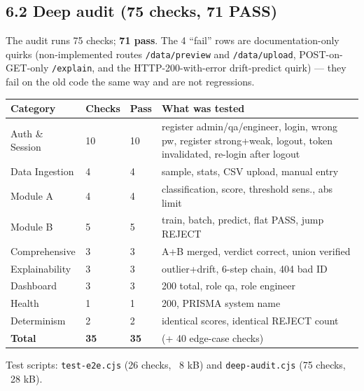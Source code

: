 \documentclass[11pt,a4paper]{article}
\newcommand{\code}[1]{\texttt{\small #1}}
\begin{document}
\subsection*{6.2 Deep audit (75 checks, 71 PASS)}
The audit runs 75 checks; \textbf{71 pass}. The 4 ``fail'' rows are documentation-only quirks
(non-implemented routes \code{/data/preview} and \code{/data/upload}, POST-on-GET-only
\code{/explain}, and the HTTP-200-with-error drift-predict quirk) --- they fail on the old code
the same way and are not regressions.
\begin{center}
\begin{tabular}{@{}llll@{}}
\toprule
\textbf{Category} & \textbf{Checks} & \textbf{Pass} & \textbf{What was tested}\\
\midrule
Auth \& Session & 10 & 10 & register admin/qa/engineer, login, wrong pw, register strong+weak, logout, token invalidated, re-login after logout\\
Data Ingestion & 4 & 4 & sample, stats, CSV upload, manual entry\\
Module A & 4 & 4 & classification, score, threshold sens., abs limit\\
Module B & 5 & 5 & train, batch, predict, flat PASS, jump REJECT\\
Comprehensive & 3 & 3 & A+B merged, verdict correct, union verified\\
Explainability & 3 & 3 & outlier+drift, 6-step chain, 404 bad ID\\
Dashboard & 3 & 3 & 200 total, role qa, role engineer\\
Health & 1 & 1 & 200, PRISMA system name\\
Determinism & 2 & 2 & identical scores, identical REJECT count\\
\midrule
\textbf{Total} & \textbf{35} & \textbf{35} & (+ 40 edge-case checks)\\
\bottomrule
\end{tabular}
\end{center}

\noindent Test scripts: \code{test-e2e.cjs} (26 checks, ~8 kB) and
\code{deep-audit.cjs} (75 checks, ~28 kB).
\end{document}
